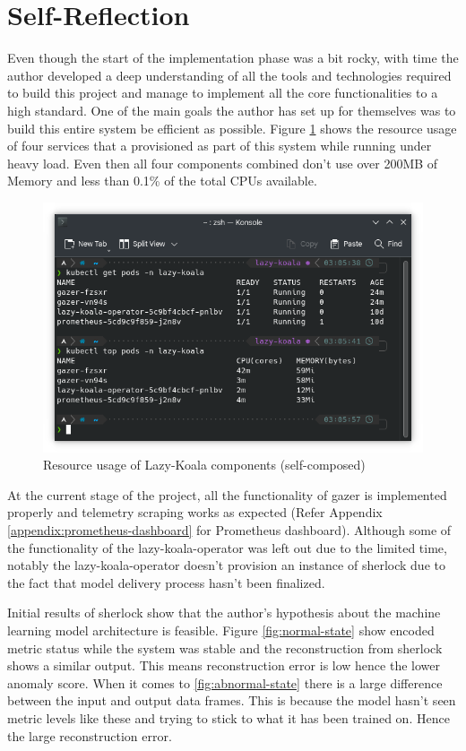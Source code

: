 \section{Self-Reflection}

Even though the start of the implementation phase was a bit rocky, with time the author developed a deep understanding of all the tools and technologies required to build this project and manage to implement all the core functionalities to a high standard. One of the main goals the author has set up for themselves was to build this entire system be efficient as possible. Figure \ref{fig:service-benchmark} shows the resource usage of four services that a provisioned as part of this system while running under heavy load. Even then all four components combined don't use over 200MB of Memory and less than 0.1\% of the total CPUs available.

\begin{figure}[H]
    \includegraphics[width=15cm]{assets/implementation/service-benchmark.png}
    \caption{Resource usage of Lazy-Koala components (self-composed)}
    \label{fig:service-benchmark}
\end{figure}

At the current stage of the project, all the functionality of \ac{gazer} is implemented properly and telemetry scraping works as expected (Refer Appendix \ref{appendix:prometheus-dashboard} for Prometheus dashboard). Although some of the functionality of the \ac{lazy-koala-operator} was left out due to the limited time, notably the \ac{lazy-koala-operator} doesn't provision an instance of \ac{sherlock} due to the fact that model delivery process hasn't been finalized.

Initial results of \ac{sherlock} show that the author's hypothesis about the machine learning model architecture is feasible. Figure \ref{fig:normal-state} show encoded metric status while the system was stable and the reconstruction from \ac{sherlock} shows a similar output. This means reconstruction error is low hence the lower anomaly score. When it comes to \ref{fig:abnormal-state} there is a large difference between the input and output data frames. This is because the model hasn't seen metric levels like these and trying to stick to what it has been trained on. Hence the large reconstruction error.

